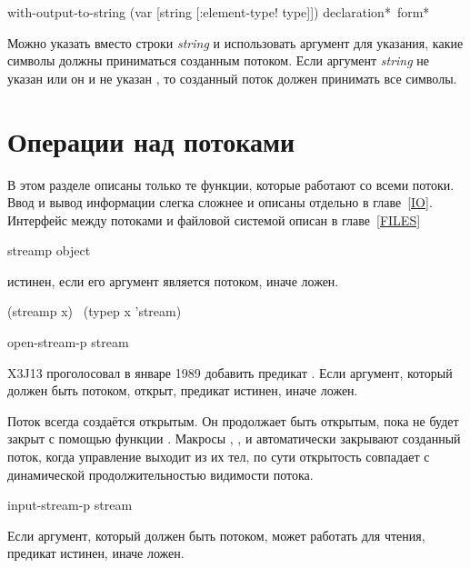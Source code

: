 \begin{newer}
\begin{defmac}
with-output-to-string (var [string [\!:element-type! type]])
                      {declaration}* {\,form}*

Можно указать  вместо строки \emph{string} и использовать аргумент
 для указания, какие символы должны приниматься созданным
потоком. Если аргумент \emph{string} не указан или он  и не указан
, то созданный поток должен принимать все символы.
\end{defmac}
\end{newer}

\section {Операции над потоками}

В этом разделе описаны только те функции, которые работают со всеми
потоки. Ввод и вывод информации слегка сложнее и описаны отдельно в
главе~\ref{IO}.
Интерфейс между потоками и файловой системой описан в главе~\ref{FILES}

\begin{defun}[Функция]
streamp object

 истинен, если его аргумент является потоком, иначе ложен.
\begin{lisp}
(streamp x) \EQ\ (typep x 'stream)
\end{lisp}
\end{defun}

\begin{newer}
\begin{defun}[Функция]
open-stream-p stream

X3J13 проголосовал в январе 1989
добавить предикат .
Если аргумент, который должен быть потоком, открыт, предикат истинен, иначе
ложен.

Поток всегда создаётся открытым. Он продолжает быть открытым, пока не будет
закрыт с помощью функции . Макросы ,
,  и 
автоматически закрывают созданный поток, когда управление выходит из их тел, по
сути открытость совпадает с динамической продолжительностью видимости потока. 
\end{defun}
\end{newer}

\begin{defun}[Функция]
input-stream-p stream

Если аргумент, который должен быть потоком, может работать для чтения, предикат
истинен, иначе ложен.
\end{defun}

